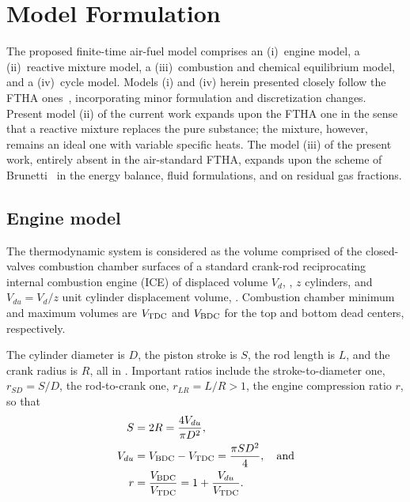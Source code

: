 \section{Model Formulation}\label{sec:model}

    The proposed finite-time air-fuel model comprises an (i)~engine model, a (ii)~reactive mixture model, a (iii)~combustion and chemical equilibrium model, and a (iv)~cycle model. Models  (i)
    and (iv) herein presented closely follow the FTHA ones~\cite{2017-NaaktgeborenC-IntJMechEngEduc}, incorporating minor formulation and discretization changes.  Present  model  (ii)  of  the
    current work expands upon the FTHA one in the sense that a reactive mixture replaces the pure substance; the mixture, however, remains an ideal one with variable specific heats. The  model
    (iii) of the present work, entirely absent in the air-standard FTHA, expands upon the scheme of Brunetti~\cite{2012-BrunettiF-Blucher} in the energy balance,  fluid  formulations,  and  on
    residual gas fractions.


    \subsection{Engine model}\label{sec:model.engine}

    The thermodynamic system is considered as the volume comprised of the closed-valves combustion chamber surfaces of a standard crank-rod reciprocating internal combustion  engine  (ICE)  of
    displaced volume $V_d$, \meter\cubed, $z$ cylinders, and $V_{du} = V_d / z$ unit cylinder displacement volume, \meter\cubed. Combustion chamber minimum and maximum volumes are $V_{\mbox{\scriptsize TDC}}$ and
    $V_{\mbox{\scriptsize BDC}}$ for the top and bottom dead centers, respectively.

    The cylinder diameter is $D$, the piston stroke is $S$, the rod length is $L$, and the crank radius is $R$, all in \meter. Important ratios include the stroke-to-diameter  one,  $r_{SD}  =
    S/D$, the rod-to-crank one, $r_{LR} = L/R > 1$, the engine compression ratio $r$, so that%
    \begin{align}
        \label{eq:S}
        S       &= 2 R = \frac{4 V_{du}}{\pi D^{2}}, \\
        \label{eq:Vdu}
        V_{du}  &= V_{\mbox{\scriptsize BDC}} - V_{\mbox{\scriptsize TDC}} = \frac{\pi SD^2}{4}, \quad\mbox{and} \\
        \label{eq:r}
        r       &= \frac{V_{\mbox{\scriptsize BDC}}}{V_{\mbox{\scriptsize TDC}}} = 1 + \frac{V_{du}}{V_{\mbox{\scriptsize TDC}}}.
    \end{align}

